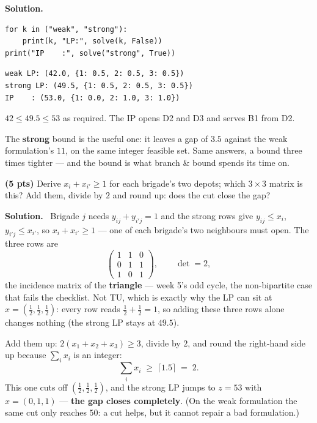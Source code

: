 \documentclass[10pt]{article}
\newenvironment{solution}
  {\par\smallskip\begingroup\color{solink}\textbf{Solution.}\ }
  {\endgroup\par}
\begin{document}
\begin{parts}
\begin{solution}
\begin{lstlisting}
for k in ("weak", "strong"):
    print(k, "LP:", solve(k, False))
print("IP    :", solve("strong", True))
\end{lstlisting}
\begin{lstlisting}
weak LP: (42.0, {1: 0.5, 2: 0.5, 3: 0.5})
strong LP: (49.5, {1: 0.5, 2: 0.5, 3: 0.5})
IP    : (53.0, {1: 0.0, 2: 1.0, 3: 1.0})
\end{lstlisting}
$42 \le 49.5 \le 53$ as required. The IP opens D2 and D3 and serves B1 from D2.

The \textbf{strong} bound is the useful one: it leaves a gap of $3.5$ against the weak
formulation's $11$, on the same integer feasible set. Same answers, a bound three times
tighter --- and the bound is what branch \& bound spends its time on.
\end{solution}

\item \textbf{(5 pts)} Derive $x_i + x_{i'} \ge 1$ for each brigade's two depots; which
  $3 \times 3$ matrix is this? Add them, divide by $2$ and round up: does the cut close the
  gap?

\begin{solution}
Brigade $j$ needs $y_{ij} + y_{i'j} = 1$ and the strong rows give $y_{ij} \le x_i$,
$y_{i'j} \le x_{i'}$, so $x_i + x_{i'} \ge 1$ --- one of each brigade's two neighbours must
open. The three rows are
\[
  \begin{pmatrix} 1&1&0 \\ 0&1&1 \\ 1&0&1 \end{pmatrix}, \qquad \det = 2 ,
\]
the incidence matrix of the \textbf{triangle} --- week 5's odd cycle, the non-bipartite case
that fails the checklist. Not TU, which is exactly why the LP can sit at
$x = (\tfrac12,\tfrac12,\tfrac12)$: every row reads $\tfrac12 + \tfrac12 = 1$, so adding
these three rows alone changes nothing (the strong LP stays at $49.5$).

Add them up: $2(x_1 + x_2 + x_3) \ge 3$, divide by $2$, and round the right-hand side up
because $\sum_i x_i$ is an integer:
\[
  \textstyle\sum_i x_i \;\ge\; \lceil 1.5 \rceil \;=\; 2 .
\]
This one cuts off $(\tfrac12,\tfrac12,\tfrac12)$, and the strong LP jumps to
$z = 53$ with $x = (0,1,1)$ --- \textbf{the gap closes completely}. (On the weak
formulation the same cut only reaches $50$: a cut helps, but it cannot repair a bad
formulation.)
\end{solution}
\end{parts}
\end{document}
